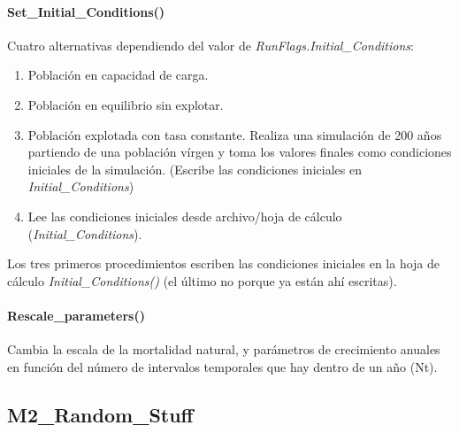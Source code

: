 \documentclass[12pt, oneside, a4paper]{article}
\begin{document}
			\paragraph{Set\_Initial\_Conditions()}
			Cuatro alternativas dependiendo del valor de \emph{RunFlags.Initial\_Conditions}: 
				\begin{enumerate}
					\item Población en capacidad de carga.
					\item Población en equilibrio sin explotar.
					\item Población explotada con tasa constante. Realiza una simulación de 200 años partiendo de una población vírgen y toma los valores finales como condiciones iniciales de la simulación. (Escribe las condiciones iniciales en \emph{Initial\_Conditions})
					\item Lee las condiciones iniciales desde archivo/hoja de cálculo (\emph{Initial\_Conditions}).
				\end{enumerate}
			Los tres primeros procedimientos escriben las condiciones iniciales en la hoja de cálculo \emph{Initial\_Conditions()} (el último no porque ya están ahí escritas).
				
			\paragraph{Rescale\_parameters()}
			Cambia la escala de la mortalidad natural, y parámetros de crecimiento anuales en función del número de intervalos temporales que hay dentro de un año (Nt).
		
			
			
		\subsection{M2\_Random\_Stuff}
\end{document}

